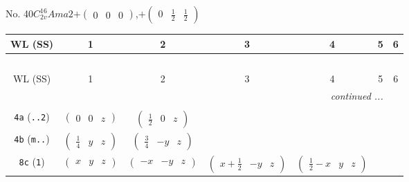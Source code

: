 \documentclass[fleqn,9pt,landscape]{jsarticle}
\begin{document}
\newpage
No. 40\quad$C_{2v}^{16}$\quad$Ama2$\quad[ orthorhombic ]\quad$+\begin{pmatrix} 0 & 0 & 0 \end{pmatrix}$,\quad $+\begin{pmatrix} 0 & \frac{1}{2} & \frac{1}{2} \end{pmatrix}$
\begin{center}
\renewcommand{\arraystretch}{1.2}
\begin{longtable}{ccccccc}
 \hline \hline
WL (SS) & 1 & 2 & 3 & 4 & 5 & 6 \\ \hline \endfirsthead

\multicolumn{6}{l}{\tablename\ \thetable{}} \\
 \hline \hline
WL (SS) & 1 & 2 & 3 & 4 & 5 & 6 \\ \hline \endhead

 \hline \hline
\multicolumn{6}{r}{\footnotesize\it continued ...} \\ \endfoot

 \hline \hline
\multicolumn{6}{r}{} \\ \endlastfoot

{\tt 4a} ({\tt ..2}) & $ \begin{pmatrix} 0 & 0 & z \end{pmatrix} $ & $ \begin{pmatrix} \frac{1}{2} & 0 & z \end{pmatrix} $ & $  $ & $  $ \\ \hline
{\tt 4b} ({\tt m..}) & $ \begin{pmatrix} \frac{1}{4} & y & z \end{pmatrix} $ & $ \begin{pmatrix} \frac{3}{4} & - y & z \end{pmatrix} $ & $  $ & $  $ \\ \hline
{\tt 8c} ({\tt 1}) & $ \begin{pmatrix} x & y & z \end{pmatrix} $ & $ \begin{pmatrix} - x & - y & z \end{pmatrix} $ & $ \begin{pmatrix} x + \frac{1}{2} & - y & z \end{pmatrix} $ & $ \begin{pmatrix} \frac{1}{2} - x & y & z \end{pmatrix} $ \\
\end{longtable}
\end{center}
\newpage
\end{document}
